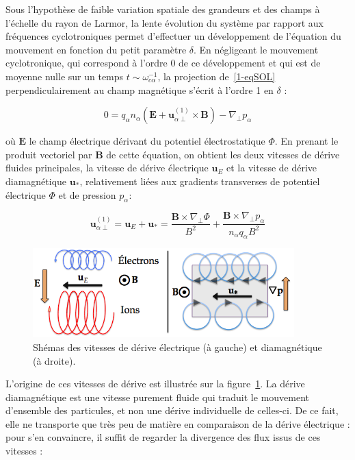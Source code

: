 \begin{refsection}
 Sous l'hypothèse de faible variation spatiale des grandeurs et des champs à
 l'échelle du rayon de Larmor, la lente évolution du système par rapport aux
 fréquences cyclotroniques permet d'effectuer un développement de l'équation du
 mouvement en fonction du petit paramètre $\delta$. En négligeant le
 mouvement cyclotronique, qui correspond à l'ordre 0 de ce développement et qui
 est de moyenne nulle sur un temps $t\sim\omega_{c\alpha}^{-1}$, la projection
 de~\eqref{1-eqSOL} perpendiculairement au champ magnétique s'écrit à l'ordre 1
 en $\delta$ :
 
 \begin{equation}
\label{1-eqSOLperp}
0
={q_\alpha n_\alpha}\left(\mathbf E+\mathbf
u_{\alpha\perp}^{(1)}\times \mathbf B\right)
-{\nabla_\perp p_\alpha}
\end{equation}

où $\mathbf E$ le champ électrique dérivant du potentiel électrostatique
$\Phi$. En prenant le produit vectoriel par $\mathbf B$ de cette équation, on
obtient les deux vitesses de dérive fluides principales, la vitesse de dérive
électrique $\mathbf u_E$ et la vitesse de dérive diamagnétique $\mathbf u_*$,
relativement liées aux gradients transverses de potentiel électrique $\Phi$ et
de pression $p_\alpha$:

\begin{equation}
\label{1-eqVitessesDerive}
\mathbf u_{\alpha\perp}^{(1)}=\mathbf u_E+\mathbf u_*=\frac{\mathbf
B\times\nabla_\perp \Phi}{B^2}+\frac{\mathbf B\times\nabla_\perp
p_\alpha}{n_\alpha q_\alpha B^2}
\end{equation}

\begin{figure}[!htbp]
    \centering
	\includegraphics[width=0.9\textwidth]{figures/1-vitessesDerive.png}
	\caption{Shémas des vitesses de dérive électrique (à gauche) et diamagnétique
	(à droite).}
	\label{1-vitessesDerive}
\end{figure}

L'origine de ces vitesses de dérive est illustrée sur la
figure~\ref{1-vitessesDerive}. La dérive diamagnétique est une vitesse
purement fluide qui traduit le mouvement d'ensemble des particules, et non
une dérive individuelle de celles-ci. De ce fait, elle ne transporte que
très peu de matière en comparaison de la dérive électrique : pour s'en
convaincre, il suffit de regarder la divergence des flux issus de ces
vitesses :


\end{refsection}
